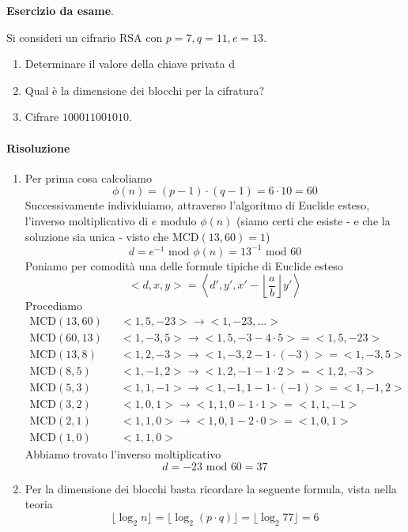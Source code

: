 \begin{framed}
	\noindent \textbf{Esercizio da esame}. 
	
	\noindent Si consideri un cifrario RSA con $p = 7, q = 11, e = 13$.
	\begin{enumerate}
		\item Determinare il valore della chiave privata d
		\item Qual è la dimensione dei blocchi per la cifratura?
		\item Cifrare $100011001010$.
	\end{enumerate}
	
	\paragraph{Risoluzione} 
	\begin{enumerate}
		\item Per prima cosa calcoliamo $$\phi(n)=(p-1)\cdot (q-1)=6 \cdot 10=60$$Successivamente individuiamo, attraverso l'algoritmo di Euclide esteso, l'inverso moltiplicativo di $e$ modulo $\phi(n)$ (siamo certi che esiste - e che la soluzione sia unica - visto che $\text{MCD}(13,60)=1$)
		$$d=e^{-1}\text{ mod }\phi(n)=13^{-1} \text{ mod } 60$$
		Poniamo per comodità una delle formule tipiche di Euclide esteso
		$$<d,x,y>=\left<d', y', x'- \left\lfloor \frac{a}{b}\right\rfloor y'\right>$$
		Procediamo
		\begin{align*}
			\text{MCD}(13,60) &&<1,5,-23> \longrightarrow <1, -23, \dots>\\
			\text{MCD}(60,13) && <1,-3,5> \longrightarrow <1,5,-3-4\cdot 5>=<1,5,-23>\\
			\text{MCD}(13,8) && <1,2,-3> \longrightarrow <1,-3,2-1\cdot(-3)>=<1,-3,5>\\
			\text{MCD}(8,5) &&<1,-1,2> \longrightarrow <1,2,-1-1\cdot 2>=<1,2,-3>\\
			\text{MCD}(5,3) && <1,1,-1> \longrightarrow <1,-1,1-1\cdot(-1)>=<1,-1,2>\\
			\text{MCD}(3,2) && <1,0,1> \longrightarrow <1,1,0-1\cdot 1>=<1,1,-1>\\
			\text{MCD}(2,1) && <1,1,0> \longrightarrow <1,0,1-2\cdot 0>=<1,0,1>\\
			\text{MCD}(1,0) && <1,1,0>
		\end{align*}
		Abbiamo trovato l'inverso moltiplicativo
		$$d=-23 \text{ mod } 60 =37$$
		\item Per la dimensione dei blocchi basta ricordare la seguente formula, vista nella teoria
		$$\lfloor \log_2 n \rfloor = \lfloor \log_2 (p\cdot q) \rfloor = \lfloor \log_2 77 \rfloor=6$$

\end{enumerate}
\end{framed}
